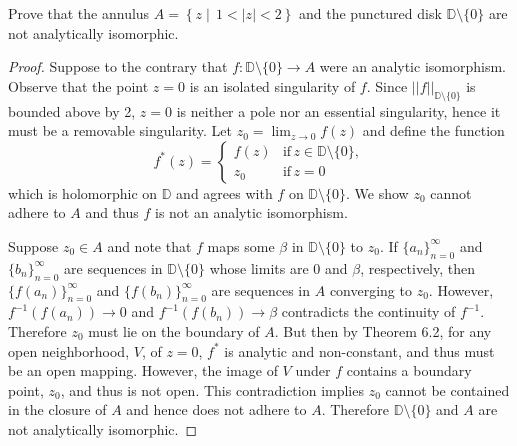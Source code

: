 \documentclass[10pt]{amsart}
\begin{document}
\begin{thm}
  \renewcommand{\D}{\mathbb{D} \setminus \{0\}}
  \label{Ex2}
  Prove that the annulus $A = \left\{z \mid \, 1 < |z| < 2 \right\}$ and the punctured disk $\D$ are not analytically isomorphic.

  \begin{proof}
    Suppose to the contrary that $f:\D \longrightarrow A$ were an analytic isomorphism.
    Observe that the point $z = 0$ is an isolated singularity of $f$.
    Since $\left\vert\left\vert f \right\vert\right\vert_{\D}$ is bounded above by 2, $z = 0$ is neither a pole nor an essential singularity, hence it must be a removable singularity.
    Let $z_0 = \lim_{z \rightarrow 0} f(z)$ and define the function
    $$
    f^*(z) = \begin{cases}
      f(z) & \text{if} \,z \in \D,\\
      z_0 & \text{if} \,z = 0
    \end{cases}
    $$ 
    which is holomorphic on $\mathbb{D}$ and agrees with $f$ on $\D$.
    We show $z_0$ cannot adhere to $A$ and thus $f$ is not an analytic isomorphism.
    
    Suppose $z_0 \in A$ and note that $f$ maps some $\beta$ in $\D$ to $z_0$.
    If $\{a_n\}_{n=0}^{\infty}$ and $\{b_n\}_{n=0}^{\infty}$ are sequences in $\D$ whose limits are $0$ and $\beta$, respectively, then $\{f(a_n)\}_{n=0}^{\infty}$ and $\{f(b_n)\}_{n=0}^{\infty}$ are sequences in $A$ converging to $z_0$.
    However, $f^{-1}(f(a_n)) \rightarrow 0$ and $f^{-1}(f(b_n))\rightarrow \beta$ contradicts the continuity of $f^{-1}$.
    Therefore $z_0$ must lie on the boundary of $A$.  
    But then by Theorem 6.2, for any open neighborhood, $V$, of $z = 0$, $f^*$ is analytic and non-constant, and thus must be an open mapping.
    However, the image of $V$ under $f$ contains a boundary point, $z_0$, and thus is not open.
    This contradiction implies $z_0$ cannot be contained in the closure of $A$ and hence does not adhere to $A$.
    Therefore $\D$ and $A$ are not analytically isomorphic.
    
  \end{proof}
\end{thm}
\end{document}
